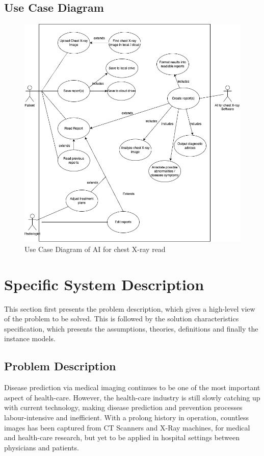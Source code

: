 \documentclass[12pt]{article}
\begin{document}
\subsection{Use Case Diagram}
\begin{figure}
    \centering
    \includegraphics[width=1\linewidth]{UseCase.png}
    \caption{Use Case Diagram of AI for chest X-ray read}
    \label{fig:enter-label}
\end{figure}

\section{Specific System Description}
This section first presents the problem description, which gives a high-level
view of the problem to be solved.  This is followed by the solution characteristics
specification, which presents the assumptions, theories, definitions and finally
the instance models.

\subsection{Problem Description}
Disease prediction via medical imaging continues to be one of the most important aspect of health-care. However, the health-care industry is still slowly catching up with current technology, making disease prediction and prevention processes labour-intensive and inefficient. With a prolong history in operation, countless images has been captured from CT Scanners and X-Ray machines, for medical and health-care research, but yet to be applied in hospital settings between physicians and patients.
\end{document}
